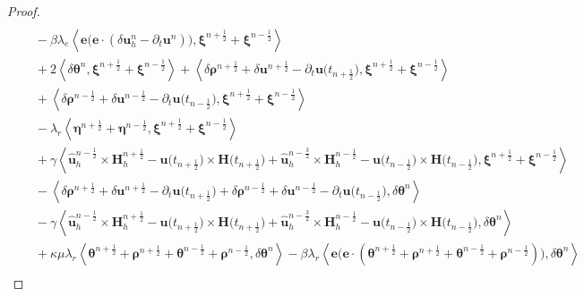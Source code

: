 \documentclass[11pt, reqno]{amsart}
\theoremstyle{definition}
\theoremstyle{remark}
\numberwithin{equation}{section}
\newcommand{\bff}{\boldsymbol}
\newcommand{\inpro}[2]{\left\langle#1,#2\right\rangle}
\begin{document}
\begin{proof}
\begin{align}
	\\
	\nonumber
	&\quad
	-
	\beta\lambda_e \inpro{\bff{e}\big(\bff{e}\cdot (\delta\bff{u}_h^n-\partial_t \bff{u}^n)\big)}{\bff{\xi}^{n+\frac12}+\bff{\xi}^{n-\frac12}}
	\\
	\nonumber
	&\quad
	+
	2\inpro{\delta \bff{\theta}^n}{\bff{\xi}^{n+\frac{1}{2}}+\bff{\xi}^{n-\frac{1}{2}}}
	+
	\inpro{\delta \bff{\rho}^{n+\frac{1}{2}}+ \delta \bff{u}^{n+\frac{1}{2}} - \partial_t \bff{u}\big(t_{n+\frac{1}{2}}\big)}{\bff{\xi}^{n+\frac{1}{2}}+\bff{\xi}^{n-\frac{1}{2}}}
	\\
	\nonumber
	&\quad
	+
	\inpro{\delta \bff{\rho}^{n-\frac{1}{2}} + \delta \bff{u}^{n-\frac{1}{2}} - \partial_t \bff{u}\big(t_{n-\frac{1}{2}}\big)}{\bff{\xi}^{n+\frac{1}{2}}+\bff{\xi}^{n-\frac{1}{2}}}
	\\
	\nonumber
	&\quad
	-
	\lambda_r \inpro{\bff{\eta}^{n+\frac{1}{2}}+\bff{\eta}^{n-\frac{1}{2}}}{\bff{\xi}^{n+\frac{1}{2}}+\bff{\xi}^{n-\frac{1}{2}}}
	\\
	\nonumber
	&\quad
	+
	\gamma \inpro{\widehat{\bff{u}}_h^{n-\frac{1}{2}} \times \bff{H}_h^{n+\frac{1}{2}} - \bff{u}\big(t_{n+\frac{1}{2}}\big)\times \bff{H}\big(t_{n+\frac{1}{2}}\big)
	+ \widehat{\bff{u}}_h^{n-\frac{3}{2}} \times \bff{H}_h^{n-\frac{1}{2}} - \bff{u}\big(t_{n-\frac{1}{2}}\big)\times \bff{H}\big(t_{n-\frac{1}{2}}\big)}{\bff{\xi}^{n+\frac{1}{2}}+\bff{\xi}^{n-\frac{1}{2}}}
	\\
	\nonumber
	&\quad 
	- 
	\inpro{\delta \bff{\rho}^{n+\frac{1}{2}}+ \delta \bff{u}^{n+\frac{1}{2}}- \partial_t \bff{u}\big(t_{n+\frac{1}{2}}\big) + \delta \bff{\rho}^{n-\frac{1}{2}}+ \delta \bff{u}^{n-\frac{1}{2}}- \partial_t \bff{u}\big(t_{n-\frac{1}{2}}\big)}{\delta \bff{\theta}^n}
	\\
	\nonumber
	&\quad
	-
	\gamma \inpro{\widehat{\bff{u}}_h^{n-\frac{1}{2}} \times \bff{H}_h^{n+\frac{1}{2}} - \bff{u}\big(t_{n+\frac{1}{2}}\big)\times \bff{H}\big(t_{n+\frac{1}{2}}\big)
	+ 
	\widehat{\bff{u}}_h^{n-\frac{3}{2}} \times \bff{H}_h^{n-\frac{1}{2}} - \bff{u}\big(t_{n-\frac{1}{2}}\big)\times \bff{H}\big(t_{n-\frac{1}{2}}\big)}{\delta \bff{\theta}^n}
	\\
	\nonumber
	&\quad
	+
	\kappa\mu \lambda_r \inpro{\bff{\theta}^{n+\frac{1}{2}}+ \bff{\rho}^{n+\frac{1}{2}} + \bff{\theta}^{n-\frac{1}{2}} + \bff{\rho}^{n-\frac{1}{2}}}{\delta \bff{\theta}^n}
	-
	\beta\lambda_r \inpro{\bff{e}\big(\bff{e}\cdot (\bff{\theta}^{n+\frac{1}{2}}+ \bff{\rho}^{n+\frac{1}{2}} + \bff{\theta}^{n-\frac{1}{2}} + \bff{\rho}^{n-\frac{1}{2}})\big)}{\delta \bff{\theta}^n}
	\\

\end{align}
\end{proof}
\end{document}
